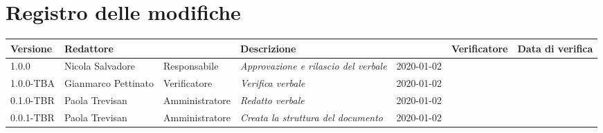 \section*{Registro delle modifiche}
\renewcommand{\arraystretch}{1.8}

  \begin{longtable}{|p{1.5cm}|p{1.7cm}|p{2cm}|p{2cm}|p{1.7cm}|p{2cm}|p{2.7cm}|}
    \hline
    \rowcolor{header}
    \textbf{Versione} & \textbf{Redattore} & \centering{\textbf{Ruolo}} & \textbf{Descrizione} &      \centering{\textbf{Data}} & \textbf{Verificatore} & \textbf{Data di verifica} \\
    \hline
    1.0.0 & Nicola Salvadore & Responsabile & \small{\textit{Approvazione e rilascio del verbale}} & 2020-01-02 & & \\
    1.0.0-TBA & Gianmarco Pettinato & Verificatore & \small{\textit{Verifica verbale}} & 2020-01-02 & & \\
	0.1.0-TBR & Paola Trevisan & Amministratore & \small{\textit{Redatto verbale}} & 2020-01-02 & & \\
    0.0.1-TBR & Paola Trevisan & Amministratore & \small{\textit{Creata la struttura del documento}} & 2020-01-02 & & \\

    \hline
  \end{longtable}
